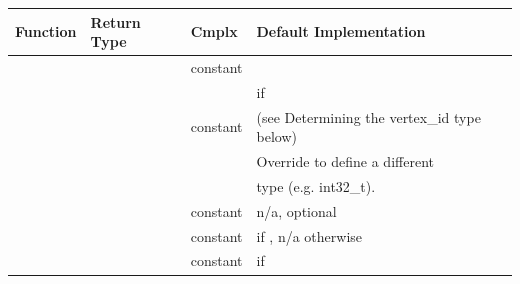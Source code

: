 \begin{table}[h!]
\begin{center}
\resizebox{\textwidth}{!}
{\begin{tabular}{l l p{1.5cm} L{7.0cm}}
\hline
    \textbf{Function} & \textbf{Return Type} & \textbf{Cmplx} & \textbf{Default Implementation} \\
\hline
     &  & constant &  \\
                               &                              &          & \hspace{3mm}if  \\
     &  & constant & (see Determining the vertex\_id type below) \\
                           &                       &          & Override to define a different \\
                           &                       &          &  type (e.g. int32\_t). \\
     &  & constant & n/a, optional \\
     &  & constant &  if , n/a otherwise \\
     &  & constant &  if  \\

\end{tabular}}
\end{center}
\end{table}
